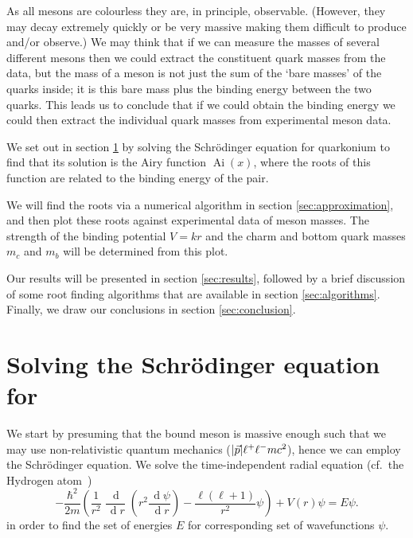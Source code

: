 \documentclass[]{article}
\renewcommand{\d}[1]{\ensuremath{\,\operatorname{d}\!{#1}}}
\renewcommand{\mod}[1]{\ensuremath{\lvert {#1} \rvert}}
\newcommand{\Ai}[1]{\ensuremath{\operatorname{Ai}({#1})}}
\begin{document}

As all mesons are colourless they are, in principle, observable. (However, they may decay extremely quickly or be very massive making them difficult to produce and/or observe.) We may think that if we can measure the masses of several different mesons then we could extract the constituent quark masses from the data, but the mass of a meson is not just the sum of the `bare masses' of the quarks inside; it is this bare mass plus the binding energy between the two quarks. This leads us to conclude that if we could obtain the binding energy we could then extract the individual quark masses from experimental meson data.

We set out in section \ref{sec:schrodinger} by solving the Schr\"{o}dinger equation for quarkonium to find that its solution is the Airy function $\Ai{x}$, where the roots of this function are related to the binding energy of the \qqbar pair.

We will find the roots via a numerical algorithm in section \ref{sec:approximation}, and then plot these roots against experimental data of meson masses. The strength of the binding potential $V=kr$ and the charm and bottom quark masses $m_{c}$ and $m_{b}$ will be determined from this plot.

Our results will be presented in section \ref{sec:results}, followed by a brief discussion of some root finding algorithms that are available in section \ref{sec:algorithms}. Finally, we draw our conclusions in section \ref{sec:conclusion}.



\section{Solving the Schr\"{o}dinger equation for \qqbar}\label{sec:schrodinger}

We start by presuming that the bound \qqbar meson is massive enough such that we may use non-relativistic quantum mechanics ($\mod{\vec{p}} \muchless mc^{2}$), hence we can employ the Schr\"{o}dinger equation. We solve the time-independent radial equation (cf.\ the Hydrogen atom~\cite{ref:dgriffithsquantum})
\begin{equation}\label{eqn:schrodinger}
-\frac{\hbar^{2}}{2m}\left (
	\frac{1}{r^{2}} \frac{\d{}}{\d{r}} \left (
		r^{2} \frac{\d{\psi}}{\d{r}}
	\right )
	- \frac{\ell(\ell+1)}{r^{2}}\psi
\right )
+ V(r)\psi = E\psi.
\end{equation}
in order to find the set of energies $E$ for corresponding set of wavefunctions $\psi$.
\end{document}
